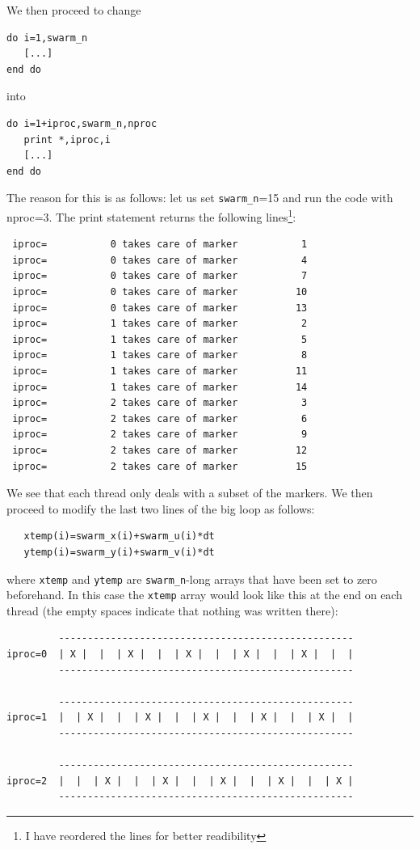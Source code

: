 We then proceed to change 
\begin{verbatim}
do i=1,swarm_n
   [...]
end do
\end{verbatim}
into
\begin{verbatim}
do i=1+iproc,swarm_n,nproc
   print *,iproc,i
   [...]
end do
\end{verbatim}
The reason for this is as follows: let us set \verb|swarm_n|=15 and run the code with nproc=3.
The print statement returns the following lines\footnote{I have reordered the lines
for better readibility}:
\begin{verbatim}
 iproc=           0 takes care of marker           1
 iproc=           0 takes care of marker           4
 iproc=           0 takes care of marker           7
 iproc=           0 takes care of marker          10
 iproc=           0 takes care of marker          13
 iproc=           1 takes care of marker           2
 iproc=           1 takes care of marker           5
 iproc=           1 takes care of marker           8
 iproc=           1 takes care of marker          11
 iproc=           1 takes care of marker          14
 iproc=           2 takes care of marker           3
 iproc=           2 takes care of marker           6
 iproc=           2 takes care of marker           9
 iproc=           2 takes care of marker          12
 iproc=           2 takes care of marker          15
\end{verbatim}
We see that each thread only deals with a subset of the markers.
We then proceed to modify the last two lines of the big loop as follows:
\begin{verbatim}
   xtemp(i)=swarm_x(i)+swarm_u(i)*dt
   ytemp(i)=swarm_y(i)+swarm_v(i)*dt
\end{verbatim}
where \verb|xtemp| and \verb|ytemp| are \verb|swarm_n|-long arrays that have been set to zero beforehand.  
In this case the \verb|xtemp| array would look like this at the end on each thread (the empty spaces indicate
that nothing was written there):
\begin{verbatim}
         ---------------------------------------------------
iproc=0  | X |  |  | X |  |  | X |  |  | X |  |  | X |  |  |
         ---------------------------------------------------

         ---------------------------------------------------
iproc=1  |  | X |  |  | X |  |  | X |  |  | X |  |  | X |  | 
         ---------------------------------------------------

         ---------------------------------------------------
iproc=2  |  |  | X |  |  | X |  |  | X |  |  | X |  |  | X |
         ---------------------------------------------------
\end{verbatim}
